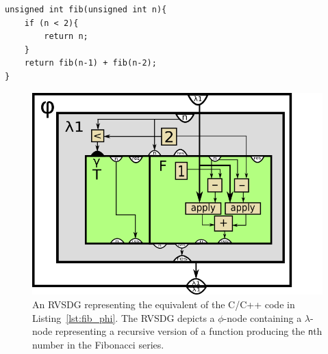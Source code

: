 \begin{itemize}
\begin{centering}
	\noindent\begin{minipage}{\textwidth}
		\begin{CenteredBox}
		\begin{lstlisting}[style=global_customcpp]
unsigned int fib(unsigned int n){
	if (n < 2){
		return n;
	}
	return fib(n-1) + fib(n-2);
}
		\end{lstlisting}
		\end{CenteredBox}
	\end{minipage}
	\label{lst:fib_phi}
\end{centering}

\begin{figure}[h!]
	\centering
	\includegraphics[width=\textwidth]{figures/recursive_fibonacci}
	\caption{An RVSDG representing the equivalent of the C/C++ code in
Listing~\ref{lst:fib_phi}. The RVSDG depicts a $\phi$-node containing a
$\lambda$-node representing a recursive version of a function producing the
\lstinline!n!th number in the Fibonacci series.}
	\label{fig:fib_phi}
\end{figure}

\end{itemize}
